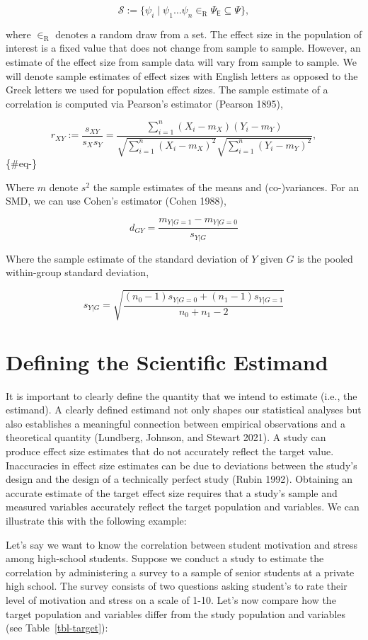 \documentclass[
  letterpaper,
  DIV=11,
  numbers=noendperiod]{scrreprt}
\begin{document}
\[
\mathcal{S} := \{\psi_i \mid  \psi_{1}\dots\psi_n \in_\text{R} \Psi_\mathsf{E} \subseteq \Psi\},
\]

where \(\in_\text{R}\) denotes a random draw from a set. The effect size
in the population of interest is a fixed value that does not change from
sample to sample. However, an estimate of the effect size from sample
data will vary from sample to sample. We will denote sample estimates of
effect sizes with English letters as opposed to the Greek letters we
used for population effect sizes. The sample estimate of a correlation
is computed via Pearson's estimator (Pearson 1895),

\[
r_{XY} := \frac{s_{XY}}{s_{X}s_{Y}} = \frac{\sum_{i=1}^n (X_i - m_{X})(Y_i - m_{Y})}{\sqrt{\sum_{i=1}^n (X_i - m_{X})^2}\sqrt{\sum_{i=1}^n (Y_i - m_{Y})^2}},
\] \{\#eq-\}

Where \(m\) denote \(s^2\) the sample estimates of the means and
(co-)variances. For an SMD, we can use Cohen's estimator (Cohen 1988),

\[
d_{GY} = \frac{m_{Y|G=1} - m_{Y|G=0}}{s_{Y|G}} 
\]

Where the sample estimate of the standard deviation of \(Y\) given \(G\)
is the pooled within-group standard deviation,

\[
s_{Y|G} = \sqrt{\frac{(n_0 - 1)s_{Y|G=0} + (n_1 - 1)s_{Y|G=1}}{n_0 + n_1 -2}}
\]

\section{Defining the Scientific
Estimand}\label{defining-the-scientific-estimand}

It is important to clearly define the quantity that we intend to
estimate (i.e., the estimand). A clearly defined estimand not only
shapes our statistical analyses but also establishes a meaningful
connection between empirical observations and a theoretical quantity
(Lundberg, Johnson, and Stewart 2021). A study can produce effect size
estimates that do not accurately reflect the target value. Inaccuracies
in effect size estimates can be due to deviations between the study's
design and the design of a technically perfect study (Rubin 1992).
Obtaining an accurate estimate of the target effect size requires that a
study's sample and measured variables accurately reflect the target
population and variables. We can illustrate this with the following
example:

Let's say we want to know the correlation between student motivation and
stress among high-school students. Suppose we conduct a study to
estimate the correlation by administering a survey to a sample of senior
students at a private high school. The survey consists of two questions
asking student's to rate their level of motivation and stress on a scale
of 1-10. Let's now compare how the target population and variables
differ from the study population and variables (see
Table~\ref{tbl-target}):
\end{document}
